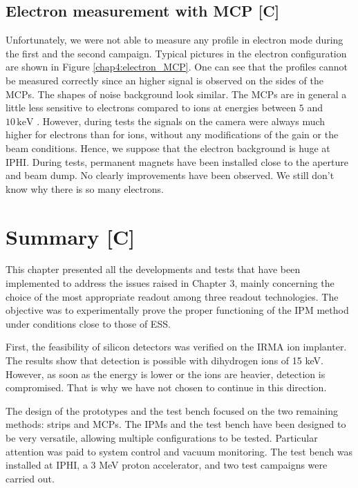 \begin{refsection}
  \subsection{Electron measurement with MCP [C]}
  Unfortunately, we were not able to measure any profile in electron mode during the first and the second campaign.
  Typical pictures in the electron configuration are shown in Figure \ref{chap4:electron_MCP}. One can see that the profiles cannot be measured correctly since an higher signal is observed on the sides of the MCPs. The shapes of noise background look similar.
  The MCPs are in general a little less sensitive to electrons compared to ions at energies between $5$ and $10\,\mathrm{keV}$ \cite{Wiza1979}.
  However, during tests the signals on the camera were always much higher for electrons than for ions, without any modifications of the gain or the beam conditions.
  Hence, we suppose that the electron background is huge at IPHI.
  During tests, permanent magnets have been installed close to the aperture and beam dump. No clearly improvements have been observed. We still don't know why there is so many electrons.
  

  \section{Summary [C]}
  \label{ch4:Summary}
  This chapter presented all the developments and tests that have been implemented to address the issues raised in Chapter 3, mainly concerning the choice of the most appropriate readout among three readout technologies. The objective was to experimentally prove the proper functioning of the IPM method under conditions close to those of ESS.

  First, the feasibility of silicon detectors was verified on the IRMA ion implanter. The results show that detection is possible with dihydrogen ions of 15 keV. However, as soon as the energy is lower or the ions are heavier, detection is compromised. That is why we have not chosen to continue in this direction.

  The design of the prototypes and the test bench focused on the two remaining methods: strips and MCPs. The IPMs and the test bench have been designed to be very versatile, allowing multiple configurations to be tested. Particular attention was paid to system control and vacuum monitoring. The test bench was installed at IPHI, a 3 MeV proton accelerator, and two test campaigns were carried out.


\end{refsection}
